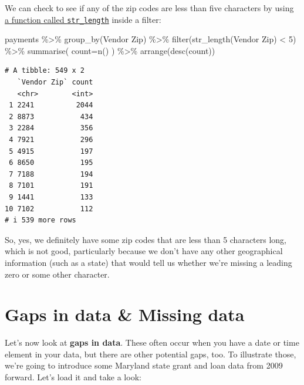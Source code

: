 \documentclass[
  letterpaper,
  DIV=11,
  numbers=noendperiod]{scrreprt}
\newenvironment{Shaded}{\begin{snugshade}}{\end{snugshade}}
\newcommand{\AttributeTok}[1]{\textcolor[rgb]{0.40,0.45,0.13}{#1}}
\newcommand{\DecValTok}[1]{\textcolor[rgb]{0.68,0.00,0.00}{#1}}
\newcommand{\FunctionTok}[1]{\textcolor[rgb]{0.28,0.35,0.67}{#1}}
\newcommand{\NormalTok}[1]{\textcolor[rgb]{0.00,0.23,0.31}{#1}}
\newcommand{\SpecialCharTok}[1]{\textcolor[rgb]{0.37,0.37,0.37}{#1}}
\newcommand{\StringTok}[1]{\textcolor[rgb]{0.13,0.47,0.30}{#1}}
\begin{document}
We can check to see if any of the zip codes are less than five
characters by using
\href{https://stringr.tidyverse.org/reference/str_length.html}{a
function called \texttt{str\_length}} inside a filter:

\begin{Shaded}
\begin{Highlighting}[]
\NormalTok{payments }\SpecialCharTok{\%\textgreater{}\%}
  \FunctionTok{group\_by}\NormalTok{(}\StringTok{\textasciigrave{}}\AttributeTok{Vendor Zip}\StringTok{\textasciigrave{}}\NormalTok{) }\SpecialCharTok{\%\textgreater{}\%}
  \FunctionTok{filter}\NormalTok{(}\FunctionTok{str\_length}\NormalTok{(}\StringTok{\textasciigrave{}}\AttributeTok{Vendor Zip}\StringTok{\textasciigrave{}}\NormalTok{) }\SpecialCharTok{\textless{}} \DecValTok{5}\NormalTok{) }\SpecialCharTok{\%\textgreater{}\%} 
  \FunctionTok{summarise}\NormalTok{(}
    \AttributeTok{count=}\FunctionTok{n}\NormalTok{()}
\NormalTok{  ) }\SpecialCharTok{\%\textgreater{}\%}
  \FunctionTok{arrange}\NormalTok{(}\FunctionTok{desc}\NormalTok{(count))}
\end{Highlighting}
\end{Shaded}

\begin{verbatim}
# A tibble: 549 x 2
   `Vendor Zip` count
   <chr>        <int>
 1 2241          2044
 2 8873           434
 3 2284           356
 4 7921           296
 5 4915           197
 6 8650           195
 7 7188           194
 8 7101           191
 9 1441           133
10 7102           112
# i 539 more rows
\end{verbatim}

So, yes, we definitely have some zip codes that are less than 5
characters long, which is not good, particularly because we don't have
any other geographical information (such as a state) that would tell us
whether we're missing a leading zero or some other character.

\hypertarget{gaps-in-data-missing-data}{%
\section{Gaps in data \& Missing data}\label{gaps-in-data-missing-data}}

Let's now look at \textbf{gaps in data}. These often occur when you have
a date or time element in your data, but there are other potential gaps,
too. To illustrate those, we're going to introduce some Maryland state
grant and loan data from 2009 forward. Let's load it and take a look:
\end{document}
